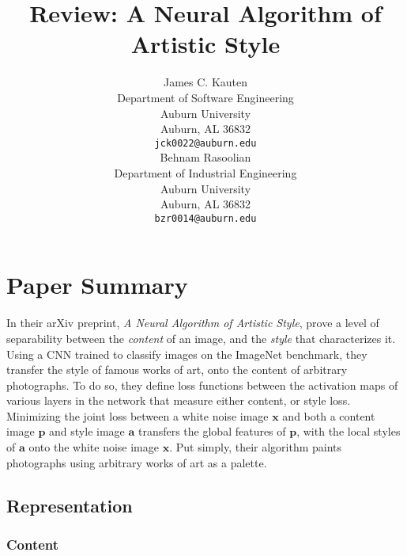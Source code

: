 \documentclass{article}
\begin{document}
\title{Review: A Neural Algorithm of Artistic Style}

\author{
    James C. Kauten \\
    Department of Software Engineering \\
    Auburn University \\
    Auburn, AL 36832 \\
    \texttt{jck0022@auburn.edu} \\
    \And
    Behnam Rasoolian \\
    Department of Industrial Engineering \\
    Auburn University \\
    Auburn, AL 36832 \\
    \texttt{bzr0014@auburn.edu} \\
}

\maketitle

\hypertarget{paper-summary}{%
\section{Paper Summary}\label{paper-summary}}

In their arXiv preprint, \textit{A Neural Algorithm of Artistic Style},
\cite{2015arXiv150806576G} prove a level of separability between the
\textit{content} of an image, and the \textit{style} that characterizes it.
Using a \ac{CNN} trained to classify images on the ImageNet benchmark, they
transfer the style of famous works of art, onto the content of arbitrary
photographs. To do so, they define loss functions between the activation maps
of various layers in the network that measure either content, or style loss.
Minimizing the joint loss between a white noise image $\textbf{x}$ and both a
content image $\textbf{p}$ and style image $\textbf{a}$ transfers the global
features of $\textbf{p}$, with the local styles of $\textbf{a}$ onto the white
noise image $\textbf{x}$. Put simply, their algorithm paints photographs using
arbitrary works of art as a palette.

\subsection{Representation}

\subsubsection{Content}
\end{document}
